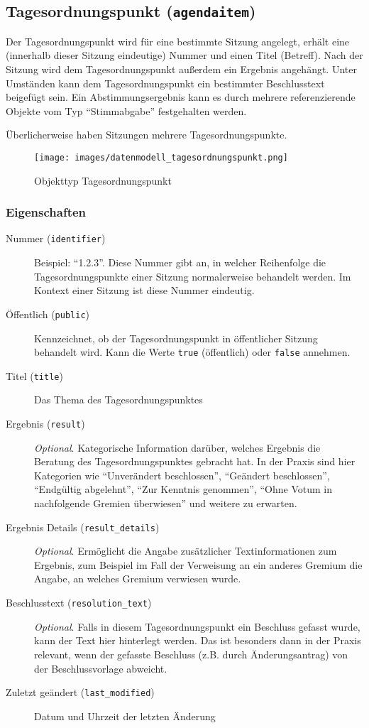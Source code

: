 \documentclass[,a4paper]{article}
\makeatletter
\def\maxwidth{\ifdim\Gin@nat@width>\linewidth\linewidth
\else\Gin@nat@width\fi}
\let\Oldincludegraphics\includegraphics
\renewcommand{\includegraphics}[1]{\Oldincludegraphics[width=\maxwidth]{#1}}
\makeatother
\begin{document}
\subsection{Tagesordnungspunkt (\texttt{agendaitem})}

Der Tagesordnungspunkt wird für eine bestimmte Sitzung angelegt, erhält
eine (innerhalb dieser Sitzung eindeutige) Nummer und einen Titel
(Betreff). Nach der Sitzung wird dem Tagesordnungspunkt außerdem ein
Ergebnis angehängt. Unter Umständen kann dem Tagesordnungspunkt ein
bestimmter Beschlusstext beigefügt sein. Ein Abstimmungsergebnis kann es
durch mehrere referenzierende Objekte vom Typ ``Stimmabgabe''
festgehalten werden.

Überlicherweise haben Sitzungen mehrere Tagesordnungspunkte.

\begin{figure}[htbp]
\centering
\texttt{[image: images/datenmodell\_tagesordnungspunkt.png]}
\caption{Objekttyp Tagesordnungspunkt}
\end{figure}

\subsubsection{Eigenschaften}

\begin{description}
\item[Nummer (\texttt{identifier})]
Beispiel: ``1.2.3''. Diese Nummer gibt an, in welcher Reihenfolge die
Tagesordnungspunkte einer Sitzung normalerweise behandelt werden. Im
Kontext einer Sitzung ist diese Nummer eindeutig.
\item[Öffentlich (\texttt{public})]
Kennzeichnet, ob der Tagesordnungspunkt in öffentlicher Sitzung
behandelt wird. Kann die Werte \texttt{true} (öffentlich) oder
\texttt{false} annehmen.
\item[Titel (\texttt{title})]
Das Thema des Tagesordnungspunktes
\item[Ergebnis (\texttt{result})]
\emph{Optional}. Kategorische Information darüber, welches Ergebnis die
Beratung des Tagesordnungspunktes gebracht hat. In der Praxis sind hier
Kategorien wie ``Unverändert beschlossen'', ``Geändert beschlossen'',
``Endgültig abgelehnt'', ``Zur Kenntnis genommen'', ``Ohne Votum in
nachfolgende Gremien überwiesen'' und weitere zu erwarten.
\item[Ergebnis Details (\texttt{result\_details})]
\emph{Optional}. Ermöglicht die Angabe zusätzlicher Textinformationen
zum Ergebnis, zum Beispiel im Fall der Verweisung an ein anderes Gremium
die Angabe, an welches Gremium verwiesen wurde.
\item[Beschlusstext (\texttt{resolution\_text})]
\emph{Optional}. Falls in diesem Tagesordnungspunkt ein Beschluss
gefasst wurde, kann der Text hier hinterlegt werden. Das ist besonders
dann in der Praxis relevant, wenn der gefasste Beschluss (z.B. durch
Änderungsantrag) von der Beschlussvorlage abweicht.
\item[Zuletzt geändert (\texttt{last\_modified})]
Datum und Uhrzeit der letzten Änderung
\end{description}
\end{document}
